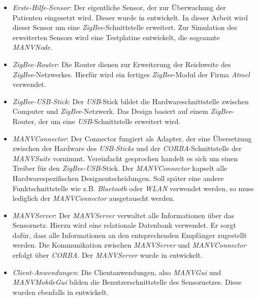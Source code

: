 \begin{itemize}
    \item{\emph{Erste-Hilfe-Sensor}:} Der eigentliche Sensor, der zur Überwachung der Patienten eingesetzt wird. Dieser 
                               wurde in \cite{Marc} entwickelt. In dieser Arbeit wird dieser Sensor um eine 
                               \emph{ZigBee}-Schnittstelle erweitert. Zur Simulation des erweiterten Sensors
                               wird eine Testplatine entwickelt, die sogeannte \emph{MANVNode}.
    \item{\emph{ZigBee-Router}:} Die Router dienen zur Erweiterung der Reichweite des \emph{ZigBee}-Netzwerkes.
                                 Hierfür wird ein fertiges \emph{ZigBee}-Modul der Firma \emph{Atmel} verwendet.
    \item{\emph{ZigBee-USB-Stick}:} Der \emph{USB}-Stick bildet die Hardwareschnittstelle zwischen Computer und 
                                    \emph{ZigBee}-Netzwerk. Das Design basiert auf einem \emph{ZigBee}-Router,
                                    der um eine \emph{USB}-Schnittstelle erweitert wird.
    \item{\emph{MANVConnector}:} Der Connector fungiert als Adapter, der eine Übersetzung zwischen der 
                                 Hardware des \emph{USB-Sticks} und der \emph{CORBA}-Schnittstelle der \emph{MANVSuite}
                                 vornimmt. Vereinfacht gesprochen handelt es sich um einen Treiber für den 
                                 \emph{ZigBee-USB}-Stick. Der \emph{MANVConnector} kapselt alle Hardwarespezifischen
                                 Designentscheidungen. Soll später eine andere Funktschnittstelle wie z.B.
                                 \emph{Bluetooth} oder \emph{WLAN} verwendet werden, so muss lediglich
                                 der \emph{MANVConnector} ausgetauscht werden.
    \item{\emph{MANVServer}:} Der \emph{MANVServer} verwaltet alle Informationen über das Sensornetz. Hierzu
                              wird eine relationale Datenbank verwendet. Er sorgt dafür, dass alle Informationen
                              an den entsprechenden Empfänger zugestellt werden. Die Kommunikation zwischen
                              \emph{MANVServer} und \emph{MANVConnector} erfolgt über \emph{CORBA}. Der 
                              \emph{MANVServer} wurde in \cite{Jan} entwickelt.
    \item{\emph{Client-Anwendungen}:} Die Clientanwendungen, also \emph{MANVGui} und \emph{MANVMobileGui} bilden
                                      die Benutzerschnittstelle des Sensornetzes. Diese wurden ebenfalls
                                      in \cite{Jan} entwickelt. 
\end{itemize}
    

